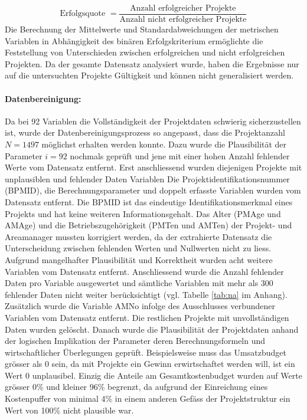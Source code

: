 \begin{equation*}
\text{Erfolgsquote } = \frac{\text{Anzahl erfolgreicher Projekte}}{\text{Anzahl nicht erfolgreicher Projekte}} 
\end{equation*}
Die Berechnung der Mittelwerte und Standardabweichungen der metrischen Variablen in Abhängigkeit des binären Erfolgskriterium ermöglichte die Feststellung von Unterschieden zwischen erfolgreichen und nicht erfolgreichen Projekten.
Da der gesamte Datensatz analysiert wurde, haben die Ergebnisse nur auf die untersuchten Projekte Gültigkeit und können nicht generalisiert werden.
\paragraph{Datenbereinigung:} Da bei 92 Variablen die Vollständigkeit der Projektdaten schwierig sicherzustellen ist, wurde der Datenbereinigungsprozess so angepasst, dass die Projektanzahl $N = 1497$ möglichst erhalten werden konnte. Dazu wurde die Plausibilität der Parameter $i = 92$ nochmals geprüft und jene mit einer hohen Anzahl fehlender Werte vom Datensatz entfernt. Erst anschliessend wurden diejenigen Projekte mit unplausiblen und fehlender Daten Variablen 
\newline\newline
Die Projektidentifikationsnummer (BPMID), die Berechnungsparameter und doppelt erfasste Variablen wurden vom Datensatz entfernt. Die BPMID ist das eindeutige Identifikationsmerkmal eines Projekts und hat keine weiteren Informationsgehalt. Das Alter (PMAge und AMAge) und die Betriebszugehörigkeit (PMTen und AMTen) der Projekt- und Areamanager mussten korrigiert werden, da der extrahierte Datensatz die Unterscheidung zwischen fehlenden Werten und Nullwerten nicht zu liess. Aufgrund mangelhafter Plausibilität und Korrektheit wurden acht weitere Variablen vom Datensatz entfernt. Anschliessend wurde die Anzahl fehlender Daten pro Variable ausgewertet und sämtliche Variablen mit mehr als 300 fehlender Daten nicht weiter berücksichtigt (vgl. Tabelle \ref{tab:na} im Anhang). Zusätzlich wurde die Variable AMNo infolge des Ausschlusses verbundener Variablen vom Datensatz entfernt. Die restlichen Projekte mit unvollständigen Daten wurden gelöscht.
\newline\newline
Danach wurde die Plausibilität der Projektdaten anhand der logischen Implikation der Parameter deren Berechnungsformeln und wirtschaftlicher Überlegungen geprüft. Beispielsweise muss das Umsatzbudget grösser als 0 sein, da mit Projekte ein Gewinn erwirtschaftet werden will, ist ein Wert 0 unplausibel. Einzig die Anteile am Gesamtkostenbudget wurden auf Werte grösser 0\% und kleiner 96\% begrenzt, da aufgrund der Einreichung eines Kostenpuffer von minimal 4\% in einem anderen Gefäss der Projektstruktur ein Wert von 100\% nicht plausible war.
